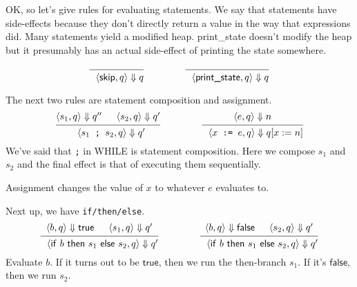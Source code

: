 \documentclass[11pt]{article}
\begin{document}
  OK, so let's give rules for evaluating statements. We say that statements have side-effects because they don't directly return a value in the way that expressions did. Many statements yield a modified heap. \textsf{print\_state} doesn't modify the heap but it presumably has an actual side-effect of printing the state somewhere.

  \[
  \begin{prooftree}
  \infer0{~~\langle \textsf{skip}, q \rangle \Downarrow q}
  \end{prooftree}  \hspace*{4em} \
  \begin{prooftree}
  \infer0{~~\langle \textsf{print\_state}, q \rangle \Downarrow q}
  \end{prooftree}
  \]

The next two rules are statement composition and assignment.
\[
  \begin{prooftree}
    \hypo{\langle s_1, q \rangle \Downarrow q''}
    \hypo{\langle s_2, q \rangle \Downarrow q'}
  \infer2{~~\langle s_1 \texttt{~;~} s_2, q \rangle \Downarrow q'}
  \end{prooftree}  \hspace*{4em} \
  \begin{prooftree}
    \hypo{\langle e, q \rangle \Downarrow n}
  \infer1{~~\langle x \texttt{~:=~} e, q \rangle \Downarrow q[x:=n]}
  \end{prooftree}
  \]
  We've said that \texttt{;} in WHILE is statement composition.
  Here we compose $s_1$ and $s_2$ and the final effect is that of
  executing them sequentially.

  Assignment changes the value of $x$ to whatever $e$ evaluates to.

Next up, we have \texttt{if/then/else}.
\[
  \begin{prooftree}
    \hypo{\langle b, q \rangle \Downarrow \mathsf{true}}
    \hypo{\langle s_1, q \rangle \Downarrow q'}
  \infer2{~~\langle \mathsf{if} ~b~ \mathsf{then} ~s_1~ \mathsf{else} ~s_2, q \rangle \Downarrow q'}
  \end{prooftree}  \hspace*{4em} \
  \begin{prooftree}
    \hypo{\langle b, q \rangle \Downarrow \mathsf{false}}
    \hypo{\langle s_2, q \rangle \Downarrow q'}
  \infer2{~~\langle \mathsf{if} ~b~ \mathsf{then} ~s_1~ \mathsf{else} ~s_2, q \rangle \Downarrow q'}
  \end{prooftree}
  \]
Evaluate $b$. If it turns out to be $\mathsf{true}$, then we run the
then-branch $s_1$. If it's $\mathsf{false}$, then we run $s_2$.
\end{document}
